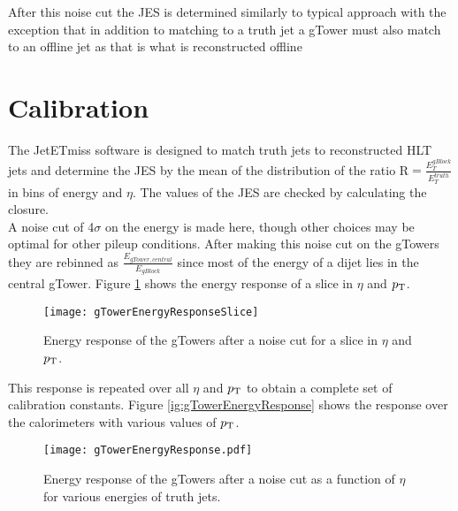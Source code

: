 
After this noise cut the JES is determined similarly to typical approach with the exception that in addition to matching to a truth jet a gTower must also match to an offline jet as that is what is reconstructed offline


\section{Calibration}

The JetETmiss software is designed to match truth jets to reconstructed HLT jets and determine the JES by the mean of the distribution of the ratio R$=\frac{E_{T}^{gBlock}}{E_{T}^{truth}}$ in bins of energy and $\eta$.  The values of the JES are checked by calculating the closure. %
 \\
 
 A noise cut of 4$\sigma$ on the energy is made here, though other choices may be optimal for other pileup conditions.  After making this noise cut on the gTowers they are rebinned as $\frac{E_{gTower, central}}{E_{gBlock}}$ since most of the energy of a dijet lies in the central gTower.  Figure \ref{fig:gTowerEnergyResponseSlice} shows the energy response of a slice in $\eta$ and $p_{\mathrm{T}}$.  \\



 \begin{figure}[h!]
  \centering
	\texttt{[image: gTowerEnergyResponseSlice]}
\caption{\label{fig:gTowerEnergyResponseSlice}{Energy response of the gTowers after a noise cut for a slice in $\eta$ and $p_{\mathrm{T}}$.}} 
\end{figure}

This response is repeated over all $\eta$ and $p_{\mathrm{T}}$ to obtain a complete set of calibration constants.  Figure \ref{ig:gTowerEnergyResponse} shows the response over the calorimeters with various values of $p_{\mathrm{T}}$.
 
 \begin{figure}[h!]
  \centering
	\texttt{[image: gTowerEnergyResponse.pdf]}
\caption{\label{fig:gTowerEnergyResponse}{Energy response of the gTowers after a noise cut as a function of $\eta$ for various energies of truth jets.}} 
\end{figure}
 
